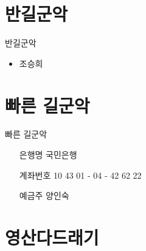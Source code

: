 \documentclass[aspectratio=1610,17pt,xcolor=pdftex,dvipsnames,table,handout]{beamer}
\begin{document}
		\section{ 반길군악 }

		\begin{frame} [t,plain]
			\begin{block} { 반길군악 }
			\begin{itemize}
				\item 조승희
			\end{itemize}
			\end{block}
		\end{frame}



		\section{ 빠른 길군악 }

		\begin{frame} [t,plain]
			\begin{block} { 빠른 길군악 }

			\setlength{\leftmargini}{5em}			
			\begin{itemize}
				\item [은행명] 국민은행
				\item [계좌번호] 10 43 01 - 04 - 42 62 22
				\item [예금주] 양인숙
			\end{itemize}
			\end{block}
		\end{frame}




		\section{ 영산다드래기 }
\end{document}
